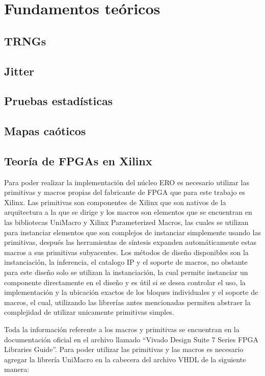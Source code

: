 \chapter{Fundamentos teóricos}
    \section{TRNGs}
    \section{Jitter}
    \section{Pruebas estadísticas}
    \section{Mapas caóticos}


    \section{Teoría de FPGAs en Xilinx}
        Para poder realizar la implementación del núcleo ERO es necesario utilizar las primitivas y macros propias del fabricante de FPGA que para este trabajo es Xilinx. Las primitivas son componentes de Xilinx que son nativos de la arquitectura a la que se dirige y los macros son elementos que se encuentran en las bibliotecas UniMacro y Xilinx Parameterized Macros, las cuales se utilizan para instanciar elementos que son complejos de instanciar simplemente usando las primitivas, después las herramientas de síntesis expanden automáticamente estas macros a sus primitivas subyacentes. Los métodos de diseño disponibles son la instanciación, la inferencia, el catalogo IP y el soporte de macros, no obstante para este diseño solo se utilizan la instanciación, la cual permite instanciar un componente directamente en el diseño y es útil si se desea controlar el uso, la implementación y la ubicación exactos de los bloques individuales y el soporte de macros, el cual, utilizando las librerías antes mencionadas permiten abstraer la complejidad de utilizar unicamente primitivas simples.

        Toda la información referente a los macros y primitivas se encuentran en la documentación oficial en el archivo llamado ``Vivado Design Suite 7 Series FPGA Libraries Guide''. Para poder utilizar las primitivas y las macros es necesario agregar la librería UniMacro en la cabecera del archivo VHDL de la siguiente manera: 

